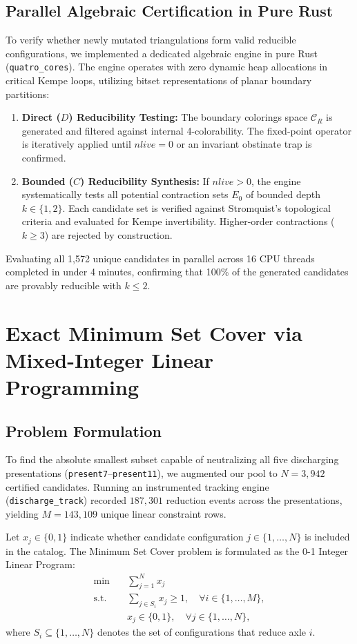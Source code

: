 \documentclass[11pt,a4paper]{article}
\theoremstyle{plain}
\theoremstyle{definition}
\begin{document}
\subsection{Parallel Algebraic Certification in Pure Rust}

To verify whether newly mutated triangulations form valid reducible configurations, we implemented a dedicated algebraic engine in pure Rust (\texttt{quatro\_cores}). The engine operates with zero dynamic heap allocations in critical Kempe loops, utilizing bitset representations of planar boundary partitions:
\begin{enumerate}
    \item \textbf{Direct ($D$) Reducibility Testing:} The boundary colorings space $\mathcal{C}_R$ is generated and filtered against internal 4-colorability. The fixed-point operator is iteratively applied until $nlive = 0$ or an invariant obstinate trap is confirmed.
    \item \textbf{Bounded ($C$) Reducibility Synthesis:} If $nlive > 0$, the engine systematically tests all potential contraction sets $E_0$ of bounded depth $k \in \{1, 2\}$. Each candidate set is verified against Stromquist's topological criteria and evaluated for Kempe invertibility. Higher-order contractions ($k \ge 3$) are rejected by construction.
\end{enumerate}
Evaluating all 1,572 unique candidates in parallel across 16 CPU threads completed in under 4 minutes, confirming that 100\% of the generated candidates are provably reducible with $k \le 2$.

\section{Exact Minimum Set Cover via Mixed-Integer Linear Programming}

\subsection{Problem Formulation}

To find the absolute smallest subset capable of neutralizing all five discharging presentations (\texttt{present7}--\texttt{present11}), we augmented our pool to $N = 3,942$ certified candidates. Running an instrumented tracking engine (\texttt{discharge\_track}) recorded $187,301$ reduction events across the presentations, yielding $M = 143,109$ unique linear constraint rows.

Let $x_j \in \{0, 1\}$ indicate whether candidate configuration $j \in \{1, \dots, N\}$ is included in the catalog. The Minimum Set Cover problem is formulated as the 0-1 Integer Linear Program:
\begin{align}
\min \quad & \sum_{j=1}^N x_j \\
\text{s.t.} \quad & \sum_{j \in S_i} x_j \ge 1, \quad \forall i \in \{1, \dots, M\}, \\
& x_j \in \{0, 1\}, \quad \forall j \in \{1, \dots, N\},
\end{align}
where $S_i \subseteq \{1, \dots, N\}$ denotes the set of configurations that reduce axle $i$.
\end{document}
